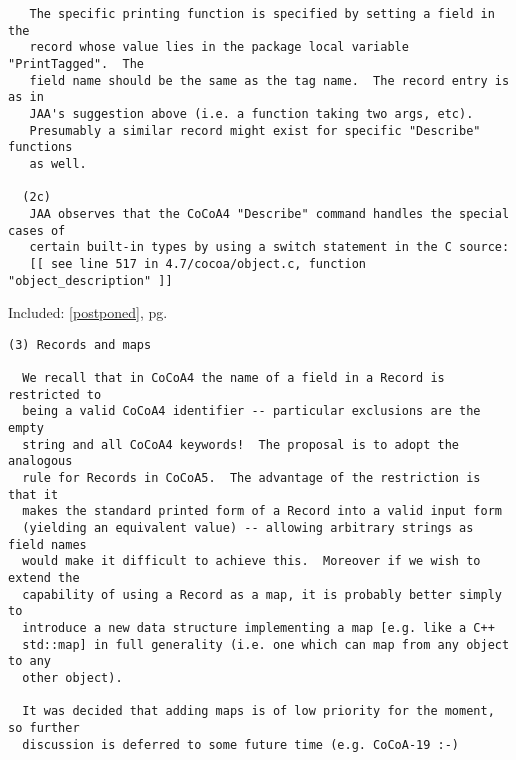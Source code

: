 \documentclass{book}[12,a4paper]
\def\refandpage#1{{\ref{#1}, pg.\pageref{#1}}}
\begin{document}
\begin{verbatim}
   The specific printing function is specified by setting a field in the
   record whose value lies in the package local variable "PrintTagged".  The
   field name should be the same as the tag name.  The record entry is as in
   JAA's suggestion above (i.e. a function taking two args, etc).
   Presumably a similar record might exist for specific "Describe" functions
   as well.

  (2c)
   JAA observes that the CoCoA4 "Describe" command handles the special cases of
   certain built-in types by using a switch statement in the C source:
   [[ see line 517 in 4.7/cocoa/object.c, function "object_description" ]]
\end{verbatim}

Included: \refandpage{postponed}
\begin{verbatim}
(3) Records and maps

  We recall that in CoCoA4 the name of a field in a Record is restricted to
  being a valid CoCoA4 identifier -- particular exclusions are the empty
  string and all CoCoA4 keywords!  The proposal is to adopt the analogous
  rule for Records in CoCoA5.  The advantage of the restriction is that it
  makes the standard printed form of a Record into a valid input form
  (yielding an equivalent value) -- allowing arbitrary strings as field names
  would make it difficult to achieve this.  Moreover if we wish to extend the
  capability of using a Record as a map, it is probably better simply to
  introduce a new data structure implementing a map [e.g. like a C++
  std::map] in full generality (i.e. one which can map from any object to any
  other object).

  It was decided that adding maps is of low priority for the moment, so further
  discussion is deferred to some future time (e.g. CoCoA-19 :-)
\end{verbatim}
\end{document}
